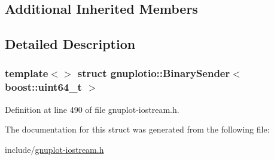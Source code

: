 \subsection*{Additional Inherited Members}


\subsection{Detailed Description}
\subsubsection*{template$<$$>$\newline
struct gnuplotio\+::\+Binary\+Sender$<$ boost\+::uint64\+\_\+t $>$}



Definition at line 490 of file gnuplot-\/iostream.\+h.



The documentation for this struct was generated from the following file\+:\begin{DoxyCompactItemize}
\item 
include/\hyperlink{gnuplot-iostream_8h}{gnuplot-\/iostream.\+h}\end{DoxyCompactItemize}
